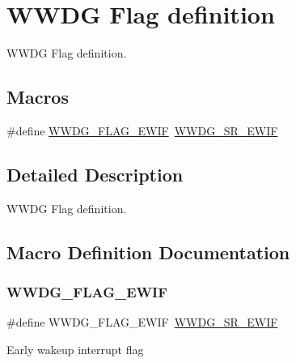 \hypertarget{group___w_w_d_g___flag__definition}{}\section{W\+W\+DG Flag definition}
\label{group___w_w_d_g___flag__definition}


W\+W\+DG Flag definition.  


\subsection*{Macros}
\begin{DoxyCompactItemize}
\item 
\#define \hyperlink{group___w_w_d_g___flag__definition_gaac081893a320f1216262be063b587edb}{W\+W\+D\+G\+\_\+\+F\+L\+A\+G\+\_\+\+E\+W\+IF}~\hyperlink{group___peripheral___registers___bits___definition_ga96cf9ddd91b6079c5aceef6f3e857b69}{W\+W\+D\+G\+\_\+\+S\+R\+\_\+\+E\+W\+IF}
\end{DoxyCompactItemize}


\subsection{Detailed Description}
W\+W\+DG Flag definition. 



\subsection{Macro Definition Documentation}
\mbox{\label{group___w_w_d_g___flag__definition_gaac081893a320f1216262be063b587edb}} 
\subsubsection{\texorpdfstring{W\+W\+D\+G\+\_\+\+F\+L\+A\+G\+\_\+\+E\+W\+IF}{WWDG\_FLAG\_EWIF}}
{\footnotesize\ttfamily \#define W\+W\+D\+G\+\_\+\+F\+L\+A\+G\+\_\+\+E\+W\+IF~\hyperlink{group___peripheral___registers___bits___definition_ga96cf9ddd91b6079c5aceef6f3e857b69}{W\+W\+D\+G\+\_\+\+S\+R\+\_\+\+E\+W\+IF}}

Early wakeup interrupt flag 